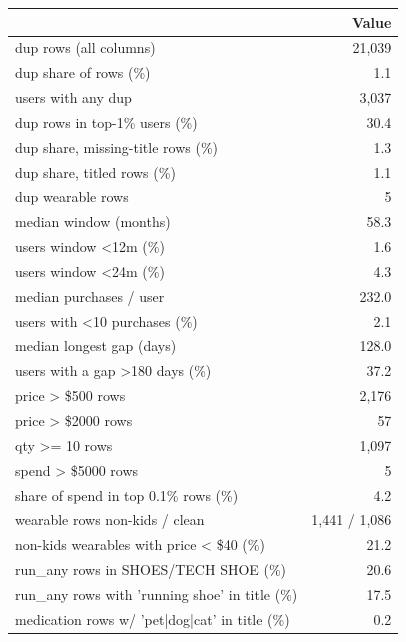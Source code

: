 \begin{tabular}{lr}
\toprule
 & Value \\
\midrule
dup rows (all columns) & 21,039 \\
dup share of rows (\%) & 1.1 \\
users with any dup & 3,037 \\
dup rows in top-1\% users (\%) & 30.4 \\
dup share, missing-title rows (\%) & 1.3 \\
dup share, titled rows (\%) & 1.1 \\
dup wearable rows & 5 \\
median window (months) & 58.3 \\
users window <12m (\%) & 1.6 \\
users window <24m (\%) & 4.3 \\
median purchases / user & 232.0 \\
users with <10 purchases (\%) & 2.1 \\
median longest gap (days) & 128.0 \\
users with a gap >180 days (\%) & 37.2 \\
price > \$500 rows & 2,176 \\
price > \$2000 rows & 57 \\
qty >= 10 rows & 1,097 \\
spend > \$5000 rows & 5 \\
share of spend in top 0.1\% rows (\%) & 4.2 \\
wearable rows non-kids / clean & 1,441 / 1,086 \\
non-kids wearables with price < \$40 (\%) & 21.2 \\
run\_any rows in SHOES/TECH SHOE (\%) & 20.6 \\
run\_any rows with 'running shoe' in title (\%) & 17.5 \\
medication rows w/ 'pet|dog|cat' in title (\%) & 0.2 \\
\bottomrule
\end{tabular}
